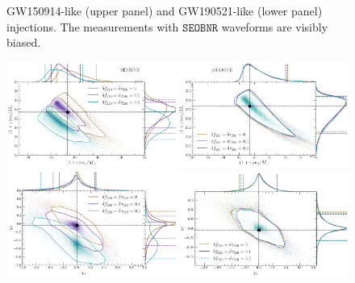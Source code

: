 \documentclass[twocolumn,prd,aps,superscriptaddress,preprintnumbers,tightenlines,showpacs,nofootinbib,eqsecnum,amsfonts,amsmath]{revtex4-1}
\newcommand{\SEOB}{\texttt{SEOBNR}}
\begin{document}
\begin{figure}
\begin{center}
{GW150914-like (upper panel) and GW190521-like (lower panel) injections. The measurements with $\SEOB$ waveforms are visibly biased.}
        \label{fig:simulated_signal_nonGR}
\end{center}
\end{figure}

\begin{figure}%
        \includegraphics[width=0.5\textwidth]{figures/GW150914_simulated_signal_0p0_0p1_0p5_gr_m1m2.png}\includegraphics[width=0.5\textwidth]{figures/GW150914_simulated_signal_0p0_0p1_0p5_ngr_m1m2.png}
        \includegraphics[width=0.5\textwidth]{figures/GW150914_simulated_signal_0p0_0p1_0p5_gr_a1za2z.png}\includegraphics[width=0.5\textwidth]{figures/GW150914_simulated_signal_0p0_0p1_0p5_ngr_a1za2z.png}

\end{figure}
\end{document}
